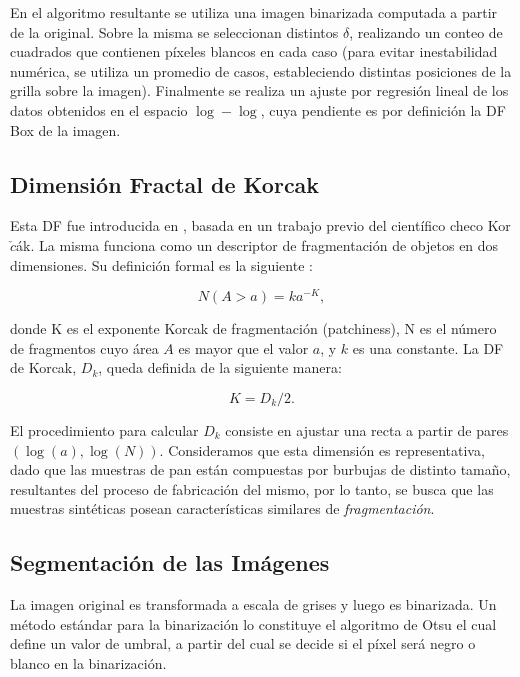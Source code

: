 En el algoritmo resultante se utiliza una imagen binarizada computada a partir de la original. Sobre la misma se seleccionan distintos $\delta$, realizando un conteo de cuadrados que contienen p\'ixeles blancos en cada caso (para evitar inestabilidad num\'erica, se utiliza un promedio de casos, estableciendo distintas posiciones de la grilla sobre la imagen). Finalmente se realiza un ajuste por regresi\'on lineal de los datos obtenidos en el espacio $\log-\log$, cuya pendiente es por definici\'on la DF Box de la imagen.

\subsection{Dimensi\'on Fractal de Korcak}
Esta DF fue introducida en \cite{Mandelbrot1983}, basada en un trabajo previo del cient\'ifico checo Kor$\check{c}$\'ak. La misma funciona como un descriptor de fragmentaci\'on de objetos en dos dimensiones. Su definici\'on formal es la siguiente \cite{Imre11}:

$$N(A > a) = k a^{-K},$$

\noindent
donde K es el exponente Korcak de fragmentaci\'on (patchiness), N es el n\'umero de fragmentos cuyo \'area $A$ es mayor que el valor $a$, y $k$ es una constante. La DF de Korcak, $D_{k}$, queda definida de la siguiente manera:

$$K = D_{k}/2.$$

El procedimiento para calcular $D_{k}$ consiste en ajustar una recta a partir de pares $(\log(a),\log(N))$. Consideramos que esta dimensión es representativa, dado que las muestras de pan est\'an compuestas por burbujas de distinto tama\~no, resultantes del proceso de fabricación del mismo, por lo tanto, se busca que las muestras sint\'eticas posean caracter\'isticas similares de {\em fragmentaci\'on}.

\subsection{Segmentaci\'on de las Im\'agenes}
La imagen original es transformada a escala de grises y luego es binarizada.
Un método estándar para la binarización lo constituye el algoritmo de Otsu \cite{Otsu79} el cual define un valor de umbral, a partir del cual se decide si el p\'ixel ser\'a negro o blanco en la binarizaci\'on. 


